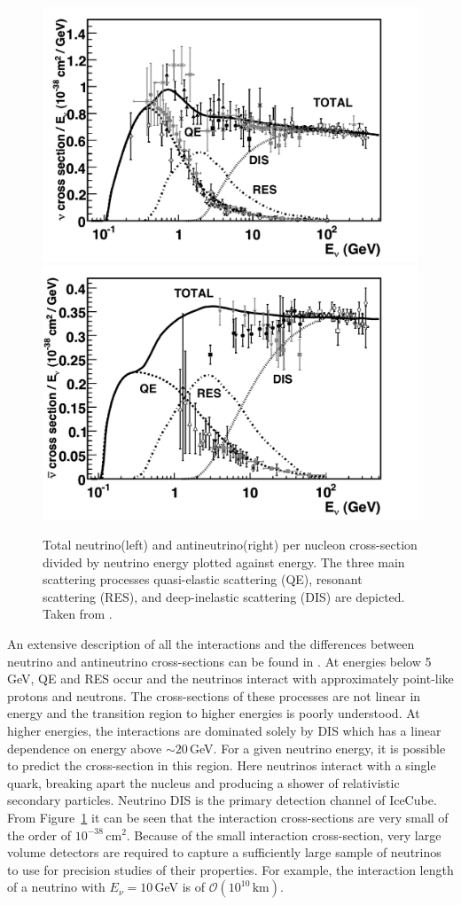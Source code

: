 \begin{figure}[ht]
	\centering
    \includegraphics[width=0.495\linewidth]{figures/cc_inclusive_nu.pdf}
    \includegraphics[width=0.495\linewidth]{figures/cc_inclusive_nubar.pdf}
	\caption[Total inclusive neutrino-nucleon cross-sections, taken from \cite{Formaggio_Cross_Sections}.]{Total neutrino(left) and antineutrino(right) per nucleon cross-section divided by neutrino energy plotted against energy.
    The three main scattering processes quasi-elastic scattering (QE), resonant scattering (RES), and deep-inelastic scattering (DIS) are depicted. Taken from \cite{Formaggio_Cross_Sections}.}
    \label{fig:cross_sections}
\end{figure}

An extensive description of all the interactions and the differences between neutrino and antineutrino cross-sections can be found in \cite{Formaggio_Cross_Sections}.
At energies below 5\,GeV, QE and RES occur and the neutrinos interact with approximately point-like protons and neutrons.
The cross-sections of these processes are not linear in energy and the transition region to higher energies is poorly understood.
At higher energies, the interactions are dominated solely by DIS which has a linear dependence on energy above $\sim20\,$GeV.
For a given neutrino energy, it is possible to predict the cross-section in this region.
Here neutrinos interact with a single quark, breaking apart the nucleus and producing a shower of relativistic secondary particles.
Neutrino DIS is the primary detection channel of IceCube.
From Figure~\ref{fig:cross_sections} it can be seen that the interaction cross-sections are very small of the order of $10^{-38}\mathrm{\,cm}^2$.
Because of the small interaction cross-section, very large volume detectors are required to capture a sufficiently large sample of neutrinos to use for precision studies of their properties.
For example, the interaction length of a neutrino with $E_\nu = 10$\,GeV is of $\mathcal{O}(10^{10}\,\mathrm{km})$.

